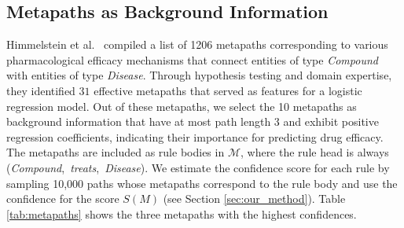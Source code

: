 \documentclass{article}
\begin{document}

\subsection{Metapaths as Background Information}

Himmelstein et al.~ compiled a list of 1206 metapaths corresponding to various pharmacological efficacy mechanisms that connect entities of type \textit{Compound} with entities of type \textit{Disease}. Through hypothesis testing and domain expertise, they identified $31$ effective metapaths that served as features for a logistic regression model. %
Out of these metapaths, we select the 10 metapaths as background information that have at most path length 3 and exhibit positive regression coefficients, indicating their importance for predicting drug efficacy. The metapaths are included as rule bodies in $\mathcal{M}$, where the rule head is always \mbox{(\textit{Compound}, \textit{treats}, \textit{Disease})}. We estimate the confidence score for each rule by sampling 10,000 paths whose metapaths correspond to the rule body and use the confidence for the score $S(M)$  (see Section {\ref{sec:our_method}}).
Table \ref{tab:metapaths} shows the three metapaths with the highest confidences.

\begin{table}
\caption{Three metapaths and their scores.}
\begin{center}
\label{tab:metapaths}
\end{center}
\end{table}
\end{document}
